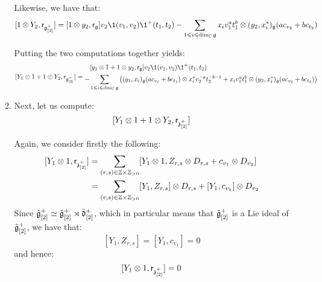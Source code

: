 \begin{remark}
\begin{enumerate}
\begin{enumerate}
                        Likewise, we have that:
                            $$[1 \tensor Y_2, \sfr_{\g_{[2]}^+}] = [1 \tensor y_2, \sfr_{\g}] v_2 \1(v_1, v_2) \1^+(t_1, t_2) - \sum_{1 \leq i \leq \dim_{\bbC} \g} x_i v_1^a t_1^b \tensor (y_2, x_i^*)_{\g} ( a c_{v_2} + b c_{t_2} )$$

                        Putting the two computations together yields:
                            $$[Y_1 \tensor 1 + 1 \tensor Y_2, \sfr_{\g_{[2]}^+}] =
                            \begin{aligned}
                                & [y_1 \tensor 1 + 1 \tensor y_2, \sfr_{\g}] v_2 \1(v_1, v_2) \1^+(t_1, t_2)
                                \\
                                - & \sum_{1 \leq i \leq \dim_{\bbC} \g} \left( (y_1, x_i)_{\g} ( a c_{v_1} + b c_{t_1} ) \tensor x_i^* v_2^{-a} t_2^{-b - 1} + x_i v_1^a t_1^b \tensor (y_2, x_i^*)_{\g} ( a c_{v_2} + b c_{t_2} ) \right)
                            \end{aligned}
                            $$
                        \item Next, let us compute:
                            $$[Y_1 \tensor 1 + 1 \tensor Y_2, \sfr_{\z_{[2]}^+}]$$
                            
                        Again, we consider firstly the following:
                            $$
                                \begin{aligned}
                                    [Y_1 \tensor 1, \sfr_{\z_{[2]}^+}] & = \sum_{(r, s) \in \Z \x \Z_{> 0}} [Y_1 \tensor 1, Z_{r, s} \tensor D_{r, s} + c_{v_1} \tensor D_{v_2}]
                                    \\
                                    & = \sum_{(r, s) \in \Z \x \Z_{> 0}} [Y_1, Z_{r, s}] \tensor D_{r, s} + [Y_1, c_{v_1}] \tensor D_{v_2}
                                \end{aligned}
                            $$
                        Since $\hat{\mathfrak{g}}_{[2]}^+ \simeq \tilde{\mathfrak{g}}_{[2]}^+ \rtimes \bar{\mathfrak{d}}_{[2]}^+$, which in particular means that $\tilde{\mathfrak{g}}_{[2]}^+$ is a Lie ideal of $\hat{\mathfrak{g}}_{[2]}^+$, we have that:
                            $$[Y_1, Z_{r, s}] = [Y_1, c_{v_1}] = 0$$
                        and hence:
                            $$[Y_1 \tensor 1, \sfr_{\z_{[2]}^+}] = 0$$


\end{enumerate}
\end{enumerate}
\end{remark}
